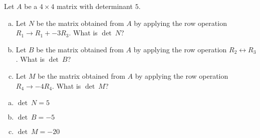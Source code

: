 
\begin{exerciseStatement}


Let \(A\) be a \(4 \times 4\) matrix with determinant \( 5 \).


\begin{enumerate}[(a)]
\item Let \(N\) be the matrix obtained from \(A\) by applying the row operation \( R_1 \to R_1 + -3R_3 \). What is \(\operatorname{det}\ N\)?
\item Let \(B\) be the matrix obtained from \(A\) by applying the row operation \( R_2 \leftrightarrow R_3 \). What is \(\operatorname{det}\ B\)?
\item Let \(M\) be the matrix obtained from \(A\) by applying the row operation \( R_4 \to -4R_4 \). What is \(\operatorname{det}\ M\)?
\end{enumerate}
    
\end{exerciseStatement}
    
\begin{exerciseAnswer} 

\begin{enumerate}[(a)]
\item \(\operatorname{det}\ N= 5 \)
\item \(\operatorname{det}\ B= -5 \)
\item \(\operatorname{det}\ M= -20 \)
\end{enumerate}
    
\end{exerciseAnswer}
    
